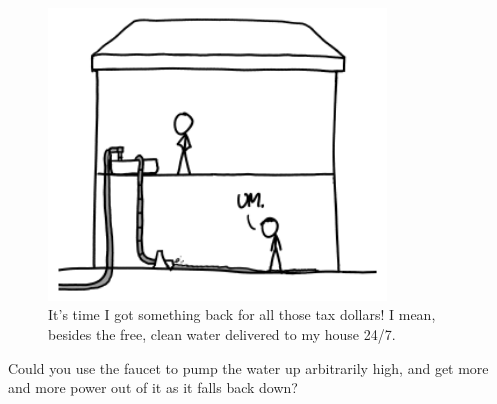{\begin{figure}[!htbp]
\centering
\includegraphics[scale=0.5, max width=0.8\textwidth]{imgs/a/91/faucet_floors.png}
\caption{It's time I got something back for all those tax dollars! I mean, besides the free, clean water delivered to my house 24/7.}
\end{figure}

{Could you use the faucet to pump the water up arbitrarily high, and get more and more power out of it as it falls back down?}

}

